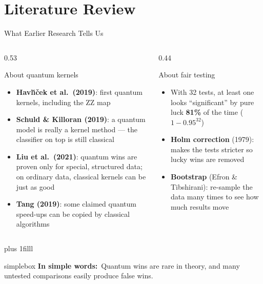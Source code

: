 \documentclass[aspectratio=169,11pt,t,xcolor={table}]{beamer}
\newcommand{\insimple}[1]{%
  \par\vskip 0pt plus 1filll
  \begin{beamercolorbox}[wd=\textwidth,sep=4pt,rounded=true]{simplebox}%
    \small\textbf{\textcolor{qamber!75!black}{In simple words:}}\ #1%
  \end{beamercolorbox}\vskip1pt}
\begin{document}
\section{Literature Review}

\begin{frame}{What Earlier Research Tells Us}
  \begin{columns}[T,onlytextwidth]
    \begin{column}{0.53\textwidth}
      \begin{block}{About quantum kernels}
        \footnotesize
        \begin{itemize}
          \item \textbf{Havl\'{\i}\v{c}ek et al.\ (2019)}: first quantum kernels, including the ZZ map
          \item \textbf{Schuld \& Killoran (2019)}: a quantum model is really a kernel method --- the classifier on top is still classical
          \item \textbf{Liu et al.\ (2021)}: quantum wins are proven only for special, structured data; on ordinary data, classical kernels can be just as good
          \item \textbf{Tang (2019)}: some claimed quantum speed-ups can be copied by classical algorithms
        \end{itemize}
      \end{block}
    \end{column}
    \begin{column}{0.44\textwidth}
      \begin{block}{About fair testing}
        \footnotesize
        \begin{itemize}
          \item With 32 tests, at least one looks ``significant'' by pure luck \textbf{81\%} of the time ($1-0.95^{32}$)
          \item \textbf{Holm correction} (1979): makes the tests stricter so lucky wins are removed
          \item \textbf{Bootstrap} (Efron \& Tibshirani): re-sample the data many times to see how much results move
        \end{itemize}
      \end{block}
    \end{column}
  \end{columns}
  \insimple{Quantum wins are rare in theory, and many untested comparisons easily produce false wins.}
\end{frame}
\end{document}
